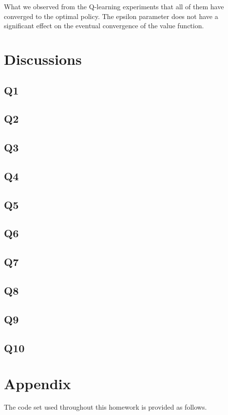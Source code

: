 \documentclass{assignment}
\begin{document}
What we observed from the Q-learning experiments that all of them have converged to the optimal policy. The epsilon parameter does not have a significant effect on the eventual convergence of the value function. 





\section{Discussions}
\subsection{Q1}

\subsection{Q2}

\subsection{Q3}

\subsection{Q4}

\subsection{Q5}

\subsection{Q6}

\subsection{Q7}

\subsection{Q8}

\subsection{Q9}

\subsection{Q10}

\section*{Appendix}
The code set used throughout this homework is provided as follows. 

% 



\nocite{*} 
\end{document}
